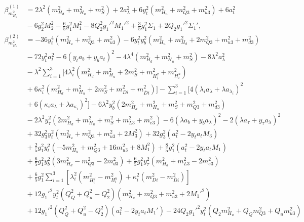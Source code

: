 \documentclass[preprint,amsmath,amssymb,aps,superscriptaddress,prd,showpacs,floatfix,nofootinbib]{revtex4-1}
\begin{document}
\begin{subequations}
\begin{align}
\beta_{m_{H_u}^2}^{(1)}&=2\lambda^2\left ( m_{H_d}^2+m_{H_u}^2+m_S^2\right )+2a_\lambda^2+6y_t^2\left ( m_{H_u}^2+m_{Q3}^2+m_{u3}^2\right )+6a_t^2\nonumber\\
&{}-6g_2^2M_2^2-\frac{6}{5}g_1^2M_1^2-8Q_2^2g_1'^2M_1'^2+\frac{3}{5}g_1^2\Sigma_1+2Q_2g_1'^2\Sigma_1',\label{eq:USSMmHu2BetaOneLoop}\\
\beta_{m_{H_u}^2}^{(2)}&=-36y_t^4\left ( m_{H_u}^2+m_{Q3}^2+m_{u3}^2\right )-6y_t^2y_b^2\left ( m_{H_u}^2+m_{H_d}^2+2m_{Q3}^2+m_{u3}^2+m_{d3}^2\right )\nonumber\\
&{}-72y_t^2a_t^2-6\left ( y_ta_b+y_ba_t\right )^2-4\lambda^4\left ( m_{H_d}^2+m_{H_u}^2+m_S^2\right )-8\lambda^2a_{\lambda}^2\nonumber\\
&{}-\lambda^2\sum_{i=1}^3\bigg [ 4\lambda_i^2\left ( m_{H_d}^2+m_{H_u}^2+2m_S^2+m_{H_i^d}^2+m_{H_i^u}^2\right )\nonumber\\
&{}+6\kappa_i^2\left ( m_{H_d}^2+m_{H_u}^2+2m_S^2+m_{Di}^2+m_{\overline{D}i}^2\right )\bigg ]-\sum_{i=1}^3 \big [4\left ( \lambda_ia_{\lambda}+\lambda a_{\lambda_i}\right )^2\nonumber\\
&{}+6\left ( \kappa_i a_{\lambda}+\lambda a_{\kappa_i}\right )^2\big ]-6\lambda^2y_b^2\left ( 2m_{H_d}^2+m_{H_u}^2+m_S^2+m_{Q3}^2+m_{d3}^2\right )\nonumber\\
&{}-2\lambda^2y_\tau^2\left ( 2m_{H_d}^2+m_{H_u}^2+m_S^2+m_{L3}^2+m_{e3}^2\right )-6\left ( \lambda a_b+y_ba_{\lambda}\right )^2-2\left ( \lambda a_\tau+y_\tau a_{\lambda}\right )^2\nonumber\\
&{}+32g_3^2y_t^2\left ( m_{H_u}^2+m_{Q3}^2+m_{u3}^2+2M_3^2\right )+32g_3^2\left ( a_t^2-2y_ta_tM_3\right )\nonumber\\
&{}+\frac{2}{5}g_1^2y_t^2\left ( -5m_{H_u}^2+m_{Q3}^2+16m_{u3}^2+8M_1^2\right )+\frac{8}{5}g_1^2\left ( a_t^2-2y_ta_tM_1\right )\nonumber\\
&{}+\frac{6}{5}g_1^2y_b^2\left ( 3m_{H_d}^2-m_{Q3}^2-2m_{d3}^2\right )+\frac{6}{5}g_1^2y_\tau^2\left ( m_{H_d}^2+m_{L3}^2-2m_{e3}^2\right )\nonumber\\
&{}+\frac{6}{5}g_1^2\sum_{i=1}^3\left [ \lambda_i^2\left ( m_{H_i^d}^2-m_{H_i^u}^2\right )+\kappa_i^2\left ( m_{Di}^2-m_{\overline{D}i}^2\right )\right ]\nonumber\\
&{}+12g_1'^2y_t^2\left ( Q_Q^2+Q_u^2-Q_2^2\right )\left ( m_{H_u}^2+m_{Q3}^2+m_{u3}^2+2M_1'^2\right )\nonumber\\
&{}+12g_1'^2\left ( Q_Q^2+Q_u^2-Q_2^2\right )\left ( a_t^2-2y_ta_tM_1'\right )-24Q_2g_1'^2y_t^2\left ( Q_2m_{H_u}^2+Q_Qm_{Q3}^2+Q_um_{u3}^2\right )\nonumber\\

\end{align}
\end{subequations}
\end{document}
